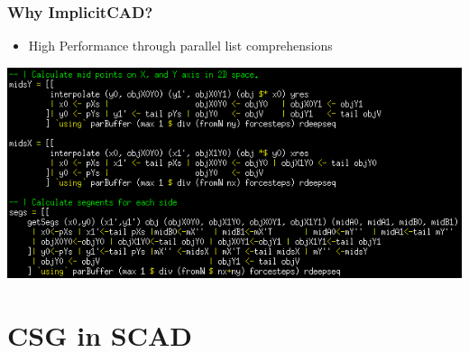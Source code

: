 \documentclass{beamer}
\begin{document}
\begin{frame}
\frametitle{Why ImplicitCAD?}
\begin{itemize}
\item High Performance through parallel list comprehensions
\end{itemize}
\includegraphics[width=1.0\textwidth, left]{2D_renderer.png}
\end{frame}

\section{CSG in SCAD}
\end{document}
